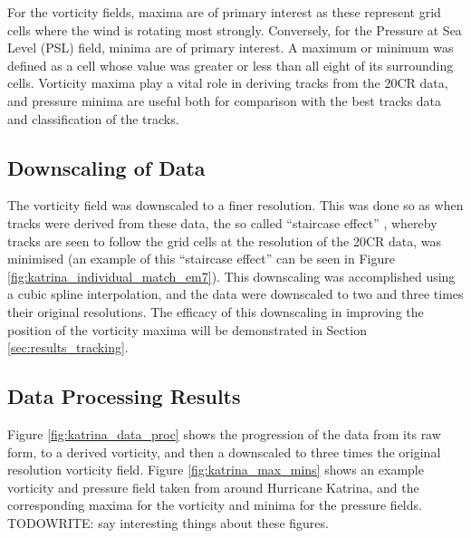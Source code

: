 \documentclass[pdftex,12pt,a4paper]{report}
\begin{document}
For the vorticity fields, maxima are of primary interest as these represent grid cells where the
wind is rotating most strongly. Conversely, for the Pressure at Sea Level (PSL) field, minima are of
primary interest. A maximum or minimum was defined as a cell whose value was greater or less than
all eight of its surrounding cells. Vorticity maxima play a vital role in deriving tracks from the
20CR data, and pressure minima are useful both for comparison with the best tracks data and
classification of the tracks.

\subsection{Downscaling of Data}

The vorticity field was downscaled to a finer resolution. This was done so as when tracks were
derived from these data, the so called ``staircase effect'' \parencite{hodges1994general}, whereby
tracks are seen to follow the grid cells at the resolution of the 20CR data, was minimised (an
example of this ``staircase effect'' can be seen in Figure \ref{fig:katrina_individual_match_em7}).
This downscaling was accomplished using a cubic spline interpolation, and the data were downscaled
to two and three times their original resolutions. The efficacy of this downscaling in improving the
position of the vorticity maxima will be demonstrated in Section \ref{sec:results_tracking}.

\subsection{Data Processing Results}

Figure \ref{fig:katrina_data_proc} shows the progression of the data from its raw form, to a derived
vorticity, and then a downscaled to three times the original resolution vorticity field. Figure
\ref{fig:katrina_max_mins} shows an example vorticity and pressure field taken from around Hurricane
Katrina, and the corresponding maxima for the vorticity and minima for the pressure fields.
TODOWRITE:
say interesting things about these figures.
\end{document}
